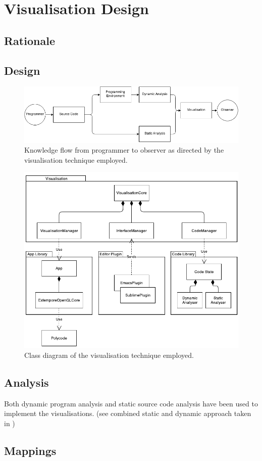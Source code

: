 
\chapter{Visualisation Design}

\section{Rationale}

\section{Design}

\begin{figure}
  \centering \includegraphics[width=\columnwidth]{../images/diagrams/knowledge-flow}
  \caption{Knowledge flow from programmer to observer as directed by the visualisation technique employed.}
\label{fig:knowledge-flow}
\end{figure}

\begin{figure}
  \centering \includegraphics[width=\columnwidth]{../images/diagrams/visualisation-class-diagram}
  \caption{Class diagram of the visualisation technique employed.}
\label{fig:visualisation-class-diagram}
\end{figure}

\section{Analysis}
Both dynamic program analysis and static source code analysis have been used to implement the visualisations. (see combined static and dynamic approach taken in \cite{Eisenbarth2003})

\section{Mappings}